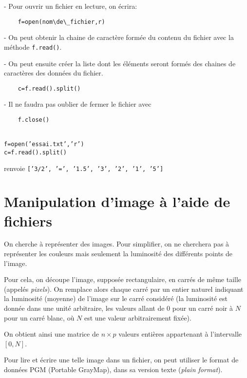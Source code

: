 - Pour ouvrir un fichier en lecture, on écrira:

\begin{lstlisting}
	f=open(nom\de\_fichier,r)
\end{lstlisting}

- On peut obtenir la chaine de caractère formée du contenu du fichier avec la méthode \texttt{f.read()}.

- On peut ensuite créer la liste dont les éléments seront formés des chaines de caractères des données du fichier.

\begin{lstlisting}
	c=f.read().split()
\end{lstlisting}

- Il ne faudra pas oublier de fermer le fichier avec 

\begin{lstlisting}
	f.close()
\end{lstlisting}

\begin{exemple}
	\ \\[1mm]
	\texttt{f=open('essai.txt','r')}	\\
	\texttt{c=f.read().split()}
\end{exemple}

renvoie \texttt{['3/2', '=', '1.5', '3', '2', '1', '5']}


\section*{Manipulation d'image à l'aide de fichiers}
	
	On cherche à représenter des  images. Pour simplifier, on ne cherchera
pas  à  représenter les  couleurs  mais  seulement  la luminosité  des
différents points de l'image.  

\medskip Pour cela, on découpe l'image, supposée
rectangulaire,  en carrés  de même  taille (appelés \emph{pixels}). On
remplace  alors chaque
carré  par un  entier  naturel indiquant  la  luminosité (moyenne)  de
l'image sur le carré considéré (la luminosité est donnée dans une
unité arbitraire, les valeurs allant de $0$ pour un carré noir à $N$
pour un carré blanc, où $N$ est une valeur arbitrairement fixée). 

On
obtient ainsi une matrice de $n\times p$ valeurs entières appartenant
à l'intervalle $[0, N]$.

\bigskip Pour lire et écrire une telle image dans un fichier, on peut utiliser
le format de données PGM (Portable GrayMap), dans sa version texte
(\textit{plain format}).

